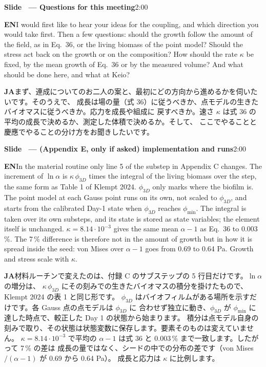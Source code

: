 \documentclass[11pt,a4paper]{article}
\newcounter{sl}
\newcommand{\slide}[2]{\stepcounter{sl}\vspace{8pt}%
  {\color{c3}\large\bfseries Slide \thesl\ --- #1}\hfill{\small #2}\par\vspace{2pt}}
\newcommand{\EN}{\textbf{EN}\quad}
\newcommand{\JA}{\par\textbf{JA}\quad}
\begin{document}
\slide{Questions for this meeting}{2:00}
\EN I would first like to hear your ideas for the coupling, and which
direction you would take first. Then a few questions: should the growth
follow the amount of the field, as in Eq.\ 36, or the living biomass of the
point model? Should the stress act back on the growth or on the composition?
How should the rate $\kappa$ be fixed, by the mean growth of Eq.\ 36 or by
the measured volume? And what should be done here, and what at Keio?
\JA まず、連成についてのお二人の案と、最初にどの方向から進めるかを伺いたいです。そのうえで、
成長は場の量（式 36）に従うべきか、点モデルの生きたバイオマスに従うべきか。応力を成長や組成に
戻すべきか。速さ $\kappa$ は式 36 の平均の成長で決めるか、測定した体積で決めるか。そして、
ここでやることと慶應でやることの分け方をお聞きしたいです。

\slide{(Appendix E, only if asked) implementation and runs}{2:00}
\EN In the material routine only line 5 of the substep in Appendix C changes.
The increment of $\ln\alpha$ is $\kappa\,\phi_{3D}$ times the integral of the
living biomass over the step, the same form as Table 1 of Klempt 2024.
$\phi_{3D}$ only marks where the biofilm is. The point model at each Gauss
point runs on its own, not scaled to $\phi_{3D}$, and starts from the
calibrated Day-1 state when $\phi_{3D}$ reaches $\phi_{\min}$. The integral is
taken over its own substeps, and its state is stored as state variables; the
element itself is unchanged. $\kappa = 8.14\cdot10^{-3}$ gives the same mean
$\alpha-1$ as Eq.\ 36 to 0.003\,\%. The 7\,\% difference is therefore not in
the amount of growth but in how it is spread inside the seed: von Mises over
$\alpha-1$ goes from 0.69 to 0.64 Pa. Growth and stress scale with $\kappa$.
\JA 材料ルーチンで変えたのは、付録 C のサブステップの 5 行目だけです。$\ln\alpha$ の増分は、
$\kappa\,\phi_{3D}$ にその刻みでの生きたバイオマスの積分を掛けたもので、Klempt 2024 の表 1 と同じ形です。
$\phi_{3D}$ はバイオフィルムがある場所を示すだけです。各 Gauss 点の点モデルは $\phi_{3D}$ に
合わせず独立に動き、$\phi_{3D}$ が $\phi_{\min}$ に達した時点で、較正した Day 1 の状態から始まります。
積分は点モデル自身の刻みで取り、その状態は状態変数に保存します。要素そのものは変えていません。
$\kappa = 8.14\cdot10^{-3}$ で平均の $\alpha-1$ は式 36 と 0.003\,\% まで一致します。したがって 7\,\% の差は
成長の量ではなく、シードの中での分布の差です（von Mises$/(\alpha-1)$ が 0.69 から 0.64 Pa）。
成長と応力は $\kappa$ に比例します。
\end{document}
